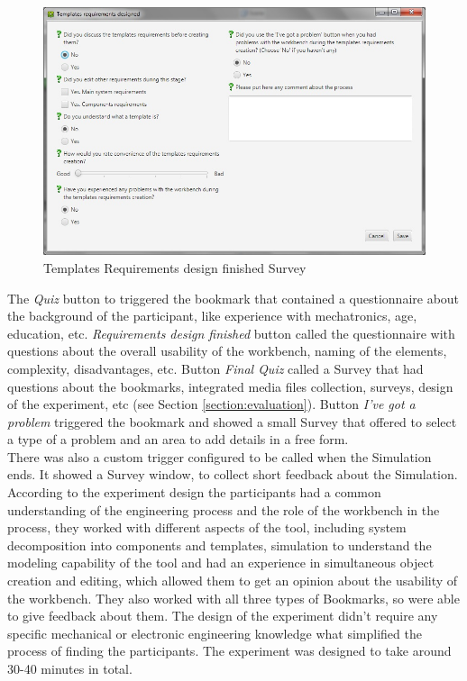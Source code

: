 \begin{figure}[htb]
 \centering
\includegraphics[width=\textwidth]{figures/templates_survey.jpg}
\caption{Templates Requirements design finished Survey}
\label{fig:templates_survey}
\end{figure}

The \textit{Quiz} button to triggered the bookmark that contained a questionnaire about the background of the participant, like experience with mechatronics, age, education, etc. \textit{Requirements design finished} button called the questionnaire with questions about the overall usability of the workbench, naming of the elements, complexity, disadvantages, etc. Button \textit{Final Quiz} called a Survey that had questions about the bookmarks, integrated media files collection, surveys, design of the experiment, etc (see Section \ref{section:evaluation}). Button \textit{I've got a problem} triggered the bookmark and showed a small Survey that offered to select a type of a problem and an area to add details in a free form.\\

There was also a custom trigger configured to be called when the Simulation ends. It showed a Survey window, to collect short feedback about the Simulation.\\

According to the experiment design the participants had a common understanding of the engineering process and the role of the workbench in the process, they worked with different aspects of the tool, including system decomposition into components and templates, simulation to understand the modeling capability of the tool and had an experience in simultaneous object creation and editing, which allowed them to get an opinion about the usability of the workbench.  They also worked with all three types of Bookmarks, so were able to give feedback about them. The design of the experiment didn't require any specific mechanical or electronic engineering knowledge what simplified the process of finding the participants. The experiment was designed to take around 30-40 minutes in total.\\


